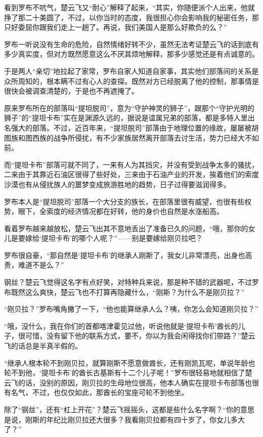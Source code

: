 看到罗布不吭气，楚云飞又“耐心”解释了起来，“其实，你随便派个人出来，他就挣了那二十美圆了，不过，以你当时的态度，我很担心你会影响我的秘密任务，那只好委屈你跟我们走上一趟了。再说，我们美国人是那么好欺负的么？”

罗布一听说没有生命的危险，自然情绪好转不少，虽然无法考证楚云飞的话到底有多少真实度，但对方既然愿意这么不厌其烦地解释，那多少感觉还是有点诚意的。

于是两人“亲切”地拉起了家常，罗布自家人知道自家事，其实他们部落间的关系是众所周知的，根本瞒不过有心人的查探。既然对方已经脱离了他的控制，那事情是很快会被调查清楚的，于是也不再遮掩了。

原来罗布所在的部落叫“提坦脱司”，意为“守护神灵的狮子”，跟那个“守护光明的狮子”的“提坦卡布”实在是渊源久远的，据说是谊属兄弟的部落，都是多特人里出名强大的部落。不过，近百年来，“提坦脱司”部落由于地理位置的缘故，屡屡被胡图族和图西族的战争所侵扰，有不少家族居然离开部落去讨生活，势力已经大不如前。

而“提坦卡布”部落可就不同了，一来有人为其挡灾，并没有受到战争太多的骚扰，二来由于其靠近石油区很得了些好处，三来由于石油产业的开发，挨着他们的索度沙漠也有从侵扰族人的噩梦变成旅游胜地的趋势，日子过得要滋润得多。

罗布本人是“提坦脱司”部落一个大分支的族长，在部落里很有威望，也很有些权势，眼下，全索度的经济情况都在好转，他的身价也自然是水涨船高。

看着罗布越来越放松，楚云飞出其不意地丢出了准备已久的问题，“哦，那你的女儿是要嫁给‘提坦卡布’的哪个人呢？”——别是要嫁给刚贝拉吧？

罗布很自豪，“那自然是‘提坦卡布’的继承人刚斯了，我女儿非常漂亮，出身也高贵，难道不是么？”

钢丝？楚云飞觉得这名字有点好笑，对特种兵来说，那是种不错的武器呢，不过罗布既然这么爽快，楚云飞也不打算再隐藏什么，“刚斯？为什么不是刚贝拉？”

“刚贝拉？”罗布嘴角撇了一下，“他也能算继承人么？咦，你怎么会知道刚贝拉？”

“哦，没什么，我在你们的首都喀津霍见过他，听说他就是‘提坦卡布’酋长的儿子，很可惜，没有留下他的联系方式，要不，你以为我会闲得找你们带路？”楚云飞的话总是半真半假的。

“继承人根本轮不到刚贝拉，就算刚斯不愿意做酋长，还有刚凯瓦呢，单说年龄也轮不到他，‘提坦卡布’的酋长古基斯有十二个儿子呢！”罗布很轻易地就相信了楚云飞的话，没别的原因，刚贝拉的生母地位很高，他本人确实在提坦卡布部落也很有名气，不过，也仅仅如此，那酋长的宝座可轮不到他坐。

除了“钢丝”，还有“杠上开花”？楚云飞摇摇头，这都是些什么名字啊？“你的意思是说，刚斯的年纪比刚贝拉还大很多？我看刚贝拉都有四十岁了，你女儿多大了？”

